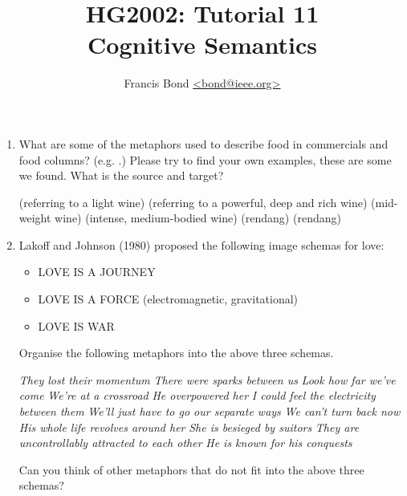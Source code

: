 \documentclass[a4paper]{article}
\title{HG2002: Tutorial 11\\  Cognitive Semantics}
\author{Francis Bond \url{<bond@ieee.org>}}
\date{}%
\begin{document}
\maketitle



\begin{enumerate}
\item What are some of the metaphors used to describe food in
  commercials and food columns?  (e.g. .)  Please try to find your own examples, these
  are some we found.  What is the source and target?
  
\begin{exe}
  \ex {} (referring to a light wine) 
  \ex {} (referring to a
  powerful, deep and rich wine)
  \ex {}
  (mid-weight wine)
  \ex {} (intense, medium-bodied wine)
  \ex {} (rendang)
  \ex {} (rendang)
  \ex {}
  \ex {}
\end{exe}
\item Lakoff and Johnson (1980) proposed the following image schemas for love:
  \begin{itemize}
  \item LOVE IS A JOURNEY
  \item LOVE IS A FORCE (electromagnetic, gravitational)
  \item LOVE IS WAR
  \end{itemize}
Organise the following metaphors into the above three schemas.
\begin{exe}
\ex \textit{They lost their momentum}
\ex \textit{There were sparks between us}
\ex \textit{Look how far we've come}
\ex \textit{We're at a crossroad}
\ex \textit{He overpowered her}
\ex \textit{I could feel the electricity between them}
\ex \textit{We'll just have to go our separate ways}
\ex \textit{We can't turn back now}
\ex \textit{His whole life revolves around her}
\ex \textit{She is besieged by suitors}
\ex \textit{They are uncontrollably attracted to each other}
\ex \textit{He is known for his conquests}
\end{exe}
Can you think of other metaphors that do not fit into the above three schemas?


\end{enumerate}
\end{document}
